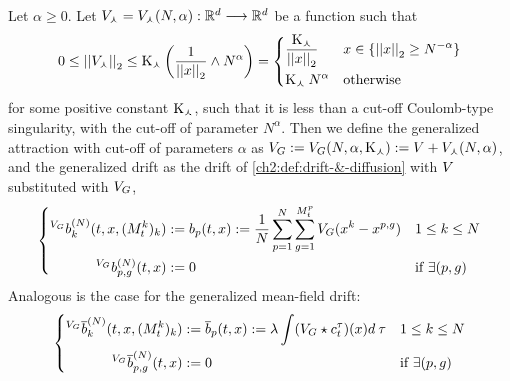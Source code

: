 \begin{definition}\label{ch5:def:generalized-attr&drift}
	Let $\alpha \geq 0$.
	Let $\cutoffSinAttraction = \cutoffSinAttraction (N, \alpha) : \R^d \longrightarrow \R^d$ be a function such that
	\begin{equation}
		0
		\leq 
		\Normp{2}{\cutoffSinAttraction}
		\leq 
		\const_\curlywedge \left( 
		\frac{1}{\Normp{2}{x}} \wedge N^\alpha
		\right)
		=
		\left\{
		\begin{aligned}
			&\frac{\const_\curlywedge}{\Normp{2}{x}}			&& x \in \{ \Normp{2}{x} \geq N^{-\alpha}\}
			\\
			&\const_\curlywedge\:N^{\alpha}						&& \text{otherwise}
		\end{aligned}
		\right.
	\end{equation}
	for some positive constant $\const_\curlywedge$,	\ie such that it is less than a cut-off Coulomb-type singularity, with the cut-off of parameter $N^{\alpha}$.
	Then we define the generalized attraction with cut-off of parameters $\alpha$ as $\genAttraction := \genAttraction(N, \alpha, \const_\curlywedge) := \attraction + \cutoffSinAttraction(N, \alpha)$, and the generalized drift as the drift of \ref{ch2:def:drift-&-diffusion} with $\attraction$ substituted with $\genAttraction$, \ie
	\begin{equation}
		\left\{
		\begin{aligned}
			{}^{\genAttraction}\drift_k^{(N)}(t,x, (\hmactive^k_t)_k) &:= \drift_p(t,x) := \frac{1}{N} \sum _{p = 1}^{N} \sum_{g = 1}^{\hmactive_t^p} \genAttraction(x^k - x^{p,g})
			&& 1\leq k \leq N
			\\
			{}^{\genAttraction}\drift_{p,g}^{(N)}(t,x) &:= 0
			&& \text{if } \exists (p,g)
		\end{aligned}
		\right.
	\end{equation}
	Analogous is the case for the generalized mean-field drift:
		\begin{equation}
		\left\{
		\begin{aligned}
			{}^{\genAttraction}\mfdrift_k^{(N)}(t,x, (\hmactive^k_t)_k) &:= \mfdrift_p(t,x) := 
			\lambda
			\int
				(\genAttraction \star \cdens_t^\tau) (x)
			d{\:\tau}
			&& 1\leq k \leq N
			\\
			{}^{\genAttraction}\mfdrift_{p,g}^{(N)}(t,x) &:= 0
			&& \text{if } \exists (p,g)
		\end{aligned}
		\right.
	\end{equation}
\end{definition}

